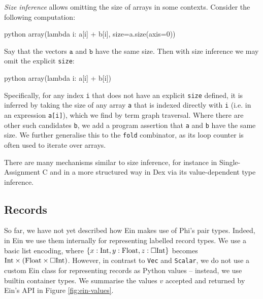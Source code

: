 \textit{Size inference} allows omitting the size of arrays in some contexts. Consider the following computation:
\begin{center} 
\begin{cminted}{python}
array(lambda i: a[i] + b[i], size=a.size(axis=0))
\end{cminted} 
\end{center}
Say that the vectors $\texttt{a}$ and $\texttt{b}$ have the same size. Then with size inference we may omit the explicit \texttt{size}:
\begin{center} 
\begin{cminted}{python}
array(lambda i: a[i] + b[i])
\end{cminted} 
\end{center}
Specifically, for any index \texttt{i} that does not have an explicit \texttt{size} defined, it is inferred by taking the size of any array \texttt{a} that is indexed directly with \texttt{i} (i.e. in an expression \texttt{a[i]}), which we find by term graph traversal. Where there are other such candidates \texttt{b}, we add a program assertion that \texttt{a} and \texttt{b} have the same size. We further generalise this to the \texttt{fold} combinator, as its loop counter is often used to iterate over arrays.


There are many mechanisms similar to size inference, for instance in Single-Assignment C and in a more structured way in Dex via its value-dependent type inference. 

\subsection{Records}

So far, we have not yet described how Ein makes use of Phi's pair types. Indeed, in Ein we use them internally for representing labelled record types. We use a basic list encoding, where $\{ x: \mathrm{Int}, y: \mathrm{Float}, z: \Box{\mathrm{Int}} \}$ becomes $\phipairtype{\phiinttype}{\left( \phifloattype \times \phivectype{\phiinttype} \right)}$. However, in contrast to \texttt{Vec} and \texttt{Scalar}, we do not use a custom Ein class for representing records as Python values -- instead, we use builtin container types. We summarise the values $v$ accepted and returned by Ein's API in Figure \ref{fig:ein-values}.

